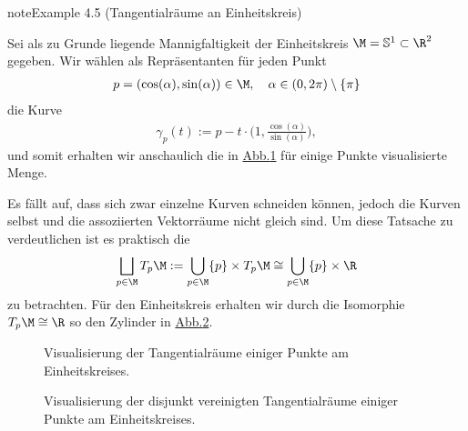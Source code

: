 \documentclass[letterpaper,10pt,german]{jupyterBook}
\let\sphinxpxdimen\pdfpxdimen\else\newdimen\sphinxpxdimen
\begin{document}
\begin{sphinxadmonition}{note}{Example 4.5 (Tangentialräume an Einheitskreis)}



\sphinxAtStartPar
Sei als zu Grunde liegende Mannigfaltigkeit der Einheitskreis \(\M = \mathbb{S}^1\subset\R^2\) gegeben.
Wir wählen als Repräsentanten für jeden Punkt
\begin{equation*}
\begin{split}p=(\cos(\alpha), \sin(\alpha))\in\M, \quad \alpha\in (0,2\pi) \setminus \{\pi\}\end{split}
\end{equation*}
\sphinxAtStartPar
die Kurve
\begin{equation*}
\begin{split}\gamma_p(t) := p - t \cdot\big(1, \frac{\cos(\alpha)}{\sin(\alpha)}\big),\end{split}
\end{equation*}
\sphinxAtStartPar
und somit erhalten wir anschaulich die in \hyperref[\detokenize{manifolds/tangential:fig-bundlea}]{Abb.\@ \ref{\detokenize{manifolds/tangential:fig-bundlea}}} für einige Punkte visualisierte Menge.

\sphinxAtStartPar
Es fällt auf, dass sich zwar einzelne Kurven schneiden können, jedoch die Kurven selbst und die assoziierten Vektorräume nicht gleich sind.
Um diese Tatsache zu verdeutlichen ist es praktisch die 
\begin{equation*}
\begin{split}\bigsqcup_{p\in\M} T_p\M := \bigcup_{p\in\M} \{p\} \times T_p\M \cong \bigcup_{p\in\M} \{p\} \times \R\end{split}
\end{equation*}
\sphinxAtStartPar
zu betrachten.
Für den Einheitskreis erhalten wir durch die Isomorphie \(T_p\M \cong \R\) so den Zylinder in \hyperref[\detokenize{manifolds/tangential:fig-bundleb}]{Abb.\@ \ref{\detokenize{manifolds/tangential:fig-bundleb}}}.
\end{sphinxadmonition}

\begin{figure}[htbp]
\centering
\capstart

\noindent\sphinxincludegraphics[height=300\sphinxpxdimen]{{bundlea}.jpg}
\caption{Visualisierung der Tangentialräume einiger Punkte am Einheitskreises.}\label{\detokenize{manifolds/tangential:fig-bundlea}}\end{figure}

\begin{figure}[htbp]
\centering
\capstart

\noindent\sphinxincludegraphics[height=300\sphinxpxdimen]{{bundleb}.jpg}
\caption{Visualisierung der disjunkt vereinigten Tangentialräume einiger Punkte am Einheitskreises.}\label{\detokenize{manifolds/tangential:fig-bundleb}}\end{figure}
\end{document}

